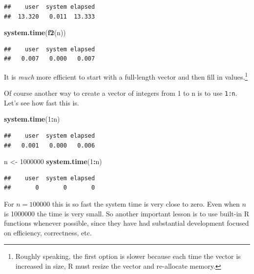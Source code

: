\documentclass[
]{krantz}
\newenvironment{Shaded}{\begin{snugshade}}{\end{snugshade}}
\newcommand{\DecValTok}[1]{\textcolor[rgb]{0.00,0.00,0.81}{#1}}
\newcommand{\KeywordTok}[1]{\textcolor[rgb]{0.13,0.29,0.53}{\textbf{#1}}}
\newcommand{\NormalTok}[1]{#1}
\newcommand{\OperatorTok}[1]{\textcolor[rgb]{0.81,0.36,0.00}{\textbf{#1}}}
\newcommand{\StringTok}[1]{\textcolor[rgb]{0.31,0.60,0.02}{#1}}
\begin{document}
\begin{verbatim}
##    user  system elapsed 
##  13.320   0.011  13.333
\end{verbatim}

\begin{Shaded}
\begin{Highlighting}[]
\KeywordTok{system.time}\NormalTok{(}\KeywordTok{f2}\NormalTok{(n))}
\end{Highlighting}
\end{Shaded}

\begin{verbatim}
##    user  system elapsed 
##   0.007   0.000   0.007
\end{verbatim}

It is \emph{much} more efficient to start with a full-length vector and then fill in values.\footnote{Roughly speaking, the first option is slower because each time the vector is increased in size, R must resize the vector and re-allocate memory.}

Of course another way to create a vector of integers from 1 to n is to use \texttt{1:n}. Let's see how fast this is.

\begin{Shaded}
\begin{Highlighting}[]
\KeywordTok{system.time}\NormalTok{(}\DecValTok{1}\OperatorTok{:}\NormalTok{n)}
\end{Highlighting}
\end{Shaded}

\begin{verbatim}
##    user  system elapsed 
##   0.001   0.000   0.006
\end{verbatim}

\begin{Shaded}
\begin{Highlighting}[]
\NormalTok{n \textless{}{-}}\StringTok{ }\DecValTok{1000000}
\KeywordTok{system.time}\NormalTok{(}\DecValTok{1}\OperatorTok{:}\NormalTok{n)      }
\end{Highlighting}
\end{Shaded}

\begin{verbatim}
##    user  system elapsed 
##       0       0       0
\end{verbatim}

For \(n=100000\) this is so fast the system time is very close to zero. Even when \(n\) is 1000000 the time is very small. So another important lesson is to use built-in R functions whenever possible, since they have had substantial development focused on efficiency, correctness, etc.
\end{document}
